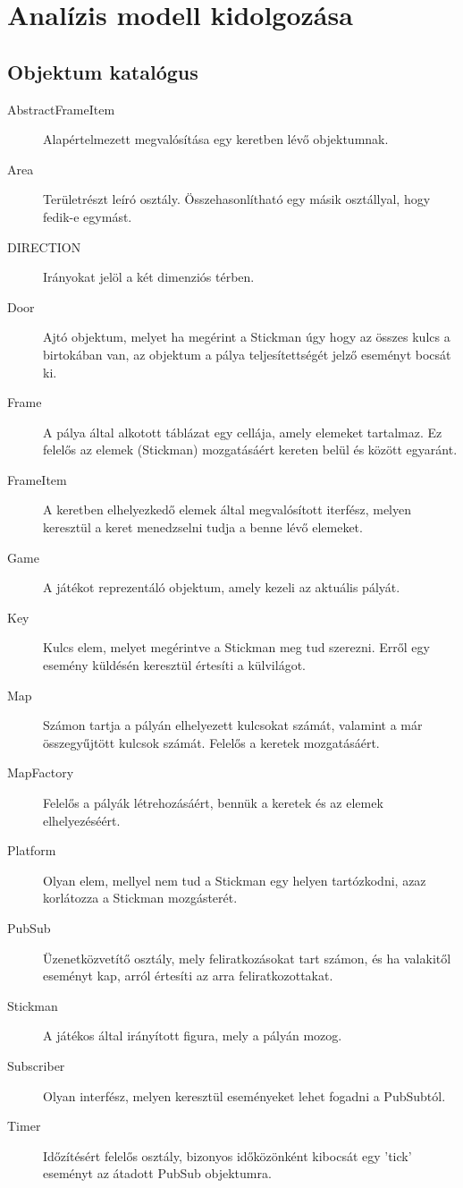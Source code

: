 



\fedlap

\addtocounter{section}{2}
\section{Analízis modell kidolgozása}

	\subsection{Objektum katalógus}
		\begin{description}
			\item[AbstractFrameItem] Alapértelmezett megvalósítása egy keretben lévő objektumnak.
			\item[Area] Területrészt leíró osztály. Összehasonlítható egy másik osztállyal, hogy fedik-e egymást.
			\item[DIRECTION] Irányokat jelöl a két dimenziós térben.
			\item[Door] Ajtó objektum, melyet ha megérint a Stickman úgy hogy az összes kulcs a birtokában van, az objektum a pálya teljesítettségét jelző eseményt bocsát ki.
			\item[Frame] A pálya által alkotott táblázat egy cellája, amely elemeket tartalmaz. Ez felelős az elemek (Stickman) mozgatásáért kereten belül és között egyaránt.
			\item[FrameItem] A keretben elhelyezkedő elemek által megvalósított iterfész, melyen keresztül a keret menedzselni tudja a benne lévő elemeket.
			\item[Game] A játékot reprezentáló objektum, amely kezeli az aktuális pályát.
			\item[Key] Kulcs elem, melyet megérintve a Stickman meg tud szerezni. Erről egy esemény küldésén keresztül értesíti a külvilágot.
			\item[Map] Számon tartja a pályán elhelyezett kulcsokat számát, valamint a már összegyűjtött kulcsok számát. Felelős a keretek mozgatásáért.
			\item[MapFactory] Felelős a pályák létrehozásáért, bennük a keretek és az elemek elhelyezéséért.
			\item[Platform] Olyan elem, mellyel nem tud a Stickman egy helyen tartózkodni, azaz korlátozza a Stickman mozgásterét.
			\item[PubSub] Üzenetközvetítő osztály, mely feliratkozásokat tart számon, és ha valakitől eseményt kap, arról értesíti az arra feliratkozottakat.
			\item[Stickman] A játékos által irányított figura, mely a pályán mozog.
			\item[Subscriber] Olyan interfész, melyen keresztül eseményeket lehet fogadni a PubSubtól.
			\item[Timer] Időzítésért felelős osztály, bizonyos időközönként kibocsát egy 'tick' eseményt az átadott PubSub objektumra.
		\end{description}
	
